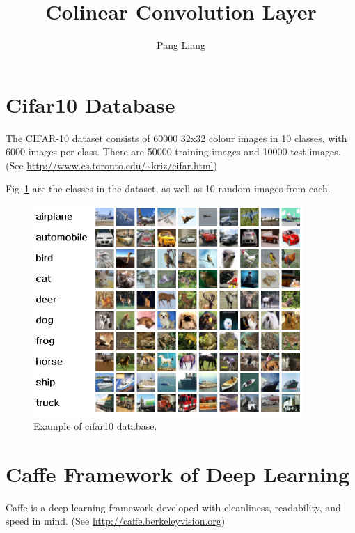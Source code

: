 \documentclass[12pt]{article}
\title{Colinear Convolution Layer}
\author{Pang Liang}
\begin{document}
\maketitle

\section{Cifar10 Database}
The CIFAR-10 dataset consists of 60000 32x32 colour images in 10 classes, with 6000 images per class. There are 50000 training images and 10000 test images. (See \url{http://www.cs.toronto.edu/~kriz/cifar.html})

Fig~\ref{fig:cifar10} are the classes in the dataset, as well as 10 random images from each.
\begin{figure}[!ht]
    \centering
    \includegraphics[height=8cm]{sample.jpg}
    \caption{\label{fig:cifar10} Example of cifar10 database. }
\end{figure}

\section{Caffe Framework of Deep Learning}
Caffe is a deep learning framework developed with cleanliness, readability, and speed in mind. (See \url{http://caffe.berkeleyvision.org})
\end{document}
